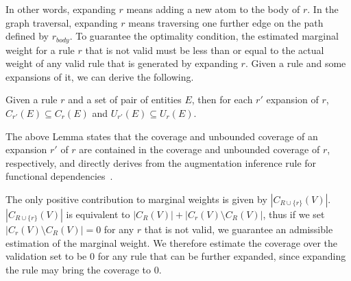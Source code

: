 In other words, expanding $r$ means adding a new atom to the body of $r$. In the graph traversal, expanding $r$ means traversing one further edge on the path defined by $r_{body}$. To guarantee the optimality condition, the estimated marginal weight for a rule $r$ that is not valid must be less than or equal to the actual weight of any valid rule that is generated by expanding $r$. Given a rule and some expansions of it, we can derive the following.

\begin{lemma} \label{lemma:krd_exp_cov}
	Given a rule $r$ and a set of pair of entities $E$, then for each $r'$ expansion of $r$, $C_{r'}(E) \subseteq C_r(E)$ and $U_{r'}(E) \subseteq U_r(E)$.
\end{lemma}


The above Lemma states that the coverage and unbounded coverage of an expansion $r'$ of $r$ are contained in the coverage and unbounded coverage of $r$, respectively, and directly derives from the augmentation inference rule for functional dependencies~\cite{abiteboul1995foundations}. 

The only positive contribution to marginal weights is given by $|C_{R \cup \{r\}}(V)|$. $|C_{R \cup \{r\}}(V)|$ is equivalent to $|C_{R}(V)| + |C_r(V) \setminus C_R(V)|$, thus if we set $|C_r(V) \setminus C_R(V)|=0$ for any $r$ that is not valid, we guarantee an admissible estimation of the marginal weight. We therefore estimate the coverage over the validation set to be $0$ for any rule that can be further expanded, since expanding the rule may bring the coverage to $0$.

